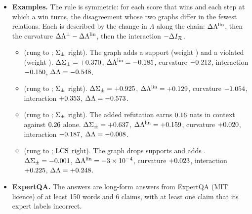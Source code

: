 \begin{itemize}[leftmargin=1.2em,itemsep=1pt,topsep=2pt]
  $\Lambda\approx\Llin$ is a poor numerical approximation (Eq.~\ref{eq:llin} is a small-weight expansion);
  the two agree on most decisions because the ladders' edits are small.
\item \textbf{Examples.} The rule is symmetric: for each score that wins and each step at which a win
  turns, the disagreement whose two graphs differ in the fewest relations. Each is described by the
  change in $\Lambda$ along the chain: $\Delta\Lambda^{\mathrm{lin}}$, then the curvature $\Delta\Lambda^{\perp}-\Delta\Lambda^{\mathrm{lin}}$,
  then the interaction $-\Delta I_{\mathcal{R}}$.
  \begin{itemize}[leftmargin=1.2em,itemsep=0pt,topsep=1pt]
  \item \dcExSumAsymLadder{} (rung \dcExSumAsymRungA{} to \dcExSumAsymRungB; $\Sigma_{\pm}$ right). The
    graph adds a support (weight \dcExSumAsymSupP) and a violated \dcExSumAsymViolType{} (weight
    \dcExSumAsymViolP). $\Delta\Sigma_{\pm}=+0.370$, $\Delta\Lambda^{\mathrm{lin}}=-0.185$, curvature
    $-0.212$, interaction $-0.150$, $\Delta\Lambda=-0.548$.
  \item \dcExSumCurvLadder{} (rung \dcExSumCurvRungA{} to \dcExSumCurvRungB; $\Sigma_{\pm}$ right).
    $\Delta\Sigma_{\pm}=+0.925$, $\Delta\Lambda^{\mathrm{lin}}=+0.129$, curvature $-1.054$,
    interaction $+0.353$, $\Delta\Lambda=-0.573$.
  \item \dcExSumInterLadder{} (rung \dcExSumInterRungA{} to \dcExSumInterRungB; $\Sigma_{\pm}$ right).
    The added refutation earns $0.16$ nats in context against
    $0.26$ alone. $\Delta\Sigma_{\pm}=+0.637$, $\Delta\Lambda^{\mathrm{lin}}=+0.159$,
    curvature $+0.020$, interaction $-0.187$,
    $\Delta\Lambda=-0.008$.
  \item \dcExLcsCurvLadder{} (rung \dcExLcsCurvRungA{} to \dcExLcsCurvRungB; $\mathrm{LCS}$ right). The graph
    drops \dcExLcsCurvRemoved{} supports and adds \dcExLcsCurvAdded.
    $\Delta\Sigma_{\pm}=-0.001$, $\Delta\Lambda^{\mathrm{lin}}=-3\times10^{-4}$, curvature $+0.023$,
    interaction $+0.225$, $\Delta\Lambda=+0.248$.
  \end{itemize}
\item \textbf{ExpertQA.} The \dcCountN{} answers are long-form answers from ExpertQA
  \citep{expertqa} (MIT licence) of at least 150 words and 6 claims, with at least one claim that
  its expert labels incorrect.
  \begin{itemize}[leftmargin=1.2em,itemsep=0pt,topsep=1pt]

\end{itemize}
\end{itemize}
